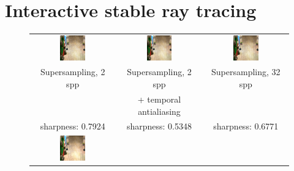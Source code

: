 \section{Interactive stable ray tracing}
\label{sec:srtcontribution}
\begin{figure}[t]
\begin{tabular}{@{}c@{}c@{}@{}c@{}}
	 \includegraphics[width=0.32\textwidth]{figures/ss_2x_rect_370_300_300_300_frame_211.png} &
		 \includegraphics[width=0.32\textwidth]{figures/ss_2x_taa_rect_370_300_300_300_frame_211.png} &
		  \includegraphics[width=0.32\textwidth]{figures/ss_32x_rect_370_300_300_300_frame_211.png} \\	 
Supersampling, 2 spp & Supersampling, 2 spp 	& Supersampling, 32 spp \\
  					 & + temporal antialiasing 	&  \\
sharpness: 0.7924 & sharpness: 0.5348 & sharpness: 0.6771  \\
	 \includegraphics[width=0.32\textwidth]{figures/srt_1_rect_370_300_300_300_frame_211.png} &

\end{tabular}
\end{figure}
